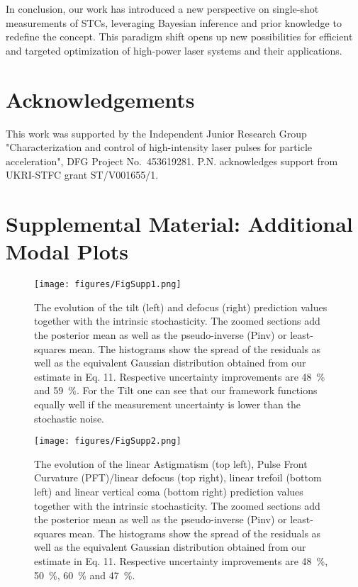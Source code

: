 \documentclass[9pt, twocolumn,superscriptaddress]{revtex4}
\begin{document}
In conclusion, our work has introduced a new perspective on single-shot measurements of STCs, leveraging Bayesian inference and prior knowledge to redefine the concept. This paradigm shift opens up new possibilities for efficient and targeted optimization of high-power laser systems and their applications.

\section*{Acknowledgements}
This work was supported by the Independent Junior Research Group "Characterization and control of high-intensity laser pulses for particle acceleration", DFG Project No.~453619281. P.N. acknowledges support from UKRI-STFC grant ST/V001655/1.





\onecolumngrid
\newpage
\section*{Supplemental Material: Additional Modal Plots}


\begin{figure*}[h]
    \centering
    \texttt{[image: figures/FigSupp1.png]}
    \caption{The evolution of the tilt (left) and defocus (right) prediction values together with the intrinsic stochasticity. The zoomed sections add the posterior mean as well as the pseudo-inverse (Pinv) or least-squares mean. The histograms show the spread of the residuals as well as the equivalent Gaussian distribution obtained from our estimate in Eq. 11. Respective uncertainty improvements are \SI{48}{\%} and \SI{59}{\%}. For the Tilt one can see that our framework functions equally well if the measurement uncertainty is lower than the stochastic noise.}
    \label{fig:linear_order_plot}
    
\end{figure*}

\begin{figure*}[h]
    \centering
    \texttt{[image: figures/FigSupp2.png]}
    \caption{The evolution of the linear Astigmatism (top left), Pulse Front Curvature (PFT)/linear defocus (top right), linear trefoil (bottom left) and linear vertical coma (bottom right) prediction values together with the intrinsic stochasticity. The zoomed sections add the posterior mean as well as the pseudo-inverse (Pinv) or least-squares mean. The histograms show the spread of the residuals as well as the equivalent Gaussian distribution obtained from our estimate in Eq. 11. Respective uncertainty improvements are \SI{48}{\%}, \SI{50}{\%}, \SI{60}{\%} and \SI{47}{\%}.}
    \label{fig:linear_order_plot}
    
\end{figure*}
\end{document}
